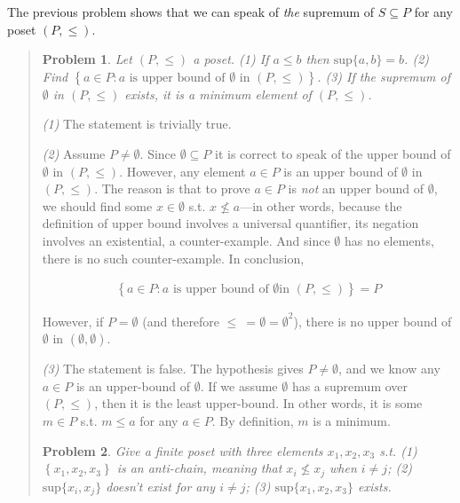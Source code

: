 \documentclass[a4paper, 12pt]{article}
\newtheorem{problem}{Problem}
\newtheorem{problem}{Problem}
\begin{document}
The previous problem shows that we can speak of \textit{the} supremum of $S
\subseteq P$ for any poset $(P, \leq) $.


\small
\begin{quote}

\begin{problem}
    Let $(P, \leq) $ a poset. \textit{(1)} If $a \leq b$ then $\text{sup}\{a, b\}
    = b$. \textit{(2)} Find $\left\{ a \in P : a \text{ is upper bound of }
    \emptyset \text{ in } (P, \leq)  \right\} $. \textit{(3)} If the supremum of
    $\emptyset$ in $(P, \leq) $ exists, it is a minimum element of $(P, \leq) $.
\end{problem}

\textit{(1)} The statement is trivially true. 

\textit{(2)} Assume $P \neq \emptyset$. Since $\emptyset \subseteq P$ it is
correct to speak of the upper bound of $\emptyset$ in $(P, \leq) $. However, any
element $a \in P$ is an upper bound of $\emptyset$ in $(P, \leq) $. The reason
is that to prove $a \in P$ is \textit{not} an upper bound of $\emptyset$, we
should find some $x \in \emptyset$ s.t. $x \not\leq a$---in other words, because
the definition of upper bound involves a universal quantifier, its negation
involves an existential, a counter-example. And since $\emptyset$ has no
elements, there is no such counter-example. In conclusion, 

\begin{align*} \left\{ a \in  P : a \text{ is upper bound of } \emptyset \text{
in } (P, \leq)  \right\} = P \end{align*}

However, if $P = \emptyset$ (and therefore $\leq ~= \emptyset = \emptyset^2$), there is no
upper bound of $\emptyset$ in $(\emptyset, \emptyset)$.

\textit{(3)}  The statement is false. The hypothesis gives $P \neq \emptyset$,
and we know any $a \in P$ is an upper-bound of $\emptyset$. If we assume
$\emptyset$ has a supremum over $(P, \leq) $, then it is the least upper-bound.
In other words, it is some $m \in P$ s.t. $m \leq a$ for any $a \in P$. By
definition, $m$ is a minimum.

\begin{problem}
    Give a finite poset with three elements $x_1, x_2, x_3$ s.t. \textit{(1)}
    $\left\{ x_1, x_2, x_3 \right\} $ is an anti-chain, meaning that $x_i
    \not\leq x_j$ when $i \neq j$; \textit{(2)} $\text{sup}\{x_i, x_j\} $
    doesn't exist for any $i \neq j$; \textit{(3)} $\text{sup}\{x_1, x_2,x_3\} $
    exists.
\end{problem}


\end{quote}
\end{document}
